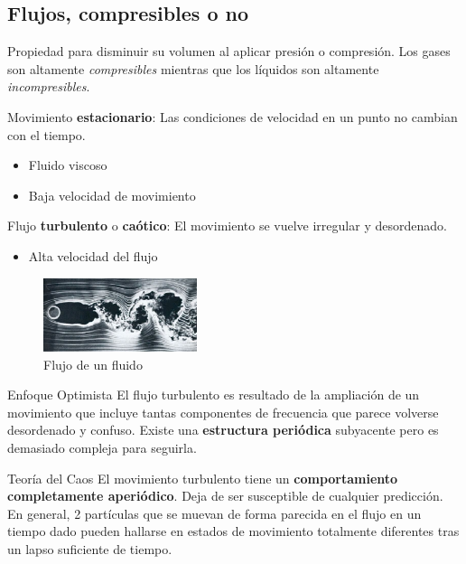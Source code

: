 \documentclass[8pt]{beamer}
\begin{document}
\subsection{Flujos, compresibles o no}
\begin{frame}
\begin{definition}
Propiedad para disminuir su volumen al aplicar presión o compresión. Los gases son altamente \emph{compresibles} mientras que los líquidos son altamente \emph{incompresibles}.
\end{definition}
\begin{block}{}
Movimiento \textbf{estacionario}: Las condiciones de velocidad en un punto no cambian con el tiempo.
\begin{itemize}
\item Fluido viscoso
\item Baja velocidad de movimiento
\end{itemize}
Flujo \textbf{turbulento} o \textbf{caótico}: El movimiento se vuelve irregular y desordenado.
\begin{itemize}
\item Alta velocidad del flujo
\end{itemize}
\end{block}
\begin{figure}[hbtp]
\centering
\includegraphics[width = 0.4\textwidth]{img/flujo_turb.jpg}
\caption{Flujo de un fluido}
\end{figure}
\end{frame}
\begin{frame}
\begin{block}{Enfoque Optimista}
El flujo turbulento es resultado de la ampliación de un movimiento que incluye tantas componentes de frecuencia que parece volverse desordenado y confuso. Existe una \textbf{estructura periódica} subyacente pero es demasiado compleja para seguirla.
\end{block}
\begin{block}{Teoría del Caos}
El movimiento turbulento tiene un \textbf{comportamiento completamente aperiódico}. Deja de ser susceptible de cualquier predicción. En general, 2 partículas que se muevan de forma parecida en el flujo en un tiempo dado pueden hallarse en estados de movimiento totalmente diferentes tras un lapso suficiente de tiempo.
\end{block}
\end{frame}
\end{document}
